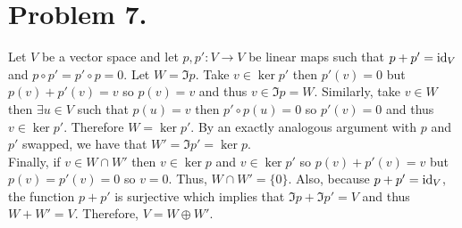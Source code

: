 \documentclass[12pt]{extarticle}
\begin{document}
\section*{Problem 7.}

Let $V$ be a vector space and let $p, p' : V \to V$ be linear maps such that $p + p' = \mathrm{id}_V$ and $p \circ p' = p' \circ p = 0$. Let $W = \Im{p}$. Take $v \in \ker{p'}$ then $p'(v) = 0$ but $p(v) + p'(v) = v$ so $p(v) = v$ and thus $v \in \Im{p} = W$. Similarly, take $v \in W$ then $\exists u \in V$ such that $p(u) = v$ then $p' \circ p(u) = 0$ so $p'(v) = 0$ and thus $v \in \ker{p'}$. Therefore $W = \ker{p'}$. By an exactly analogous argument with $p$ and $p'$ swapped, we have that $W' = \Im{p'} =\ker{p}$. \bigskip \\
Finally, if $v \in W \cap W'$ then $v \in \ker{p}$ and $v \in \ker{p'}$ so $p(v) + p'(v) = v$ but $p(v) = p'(v) = 0$ so $v = 0$. Thus, $W \cap W' = \{0\}$. Also, because $p + p' = \mathrm{id}_V$, the function $p + p'$ is surjective which implies that $\Im{p} + \Im{p'} = V$ and thus $W + W' = V$. Therefore, $V = W \oplus W'$.   
\end{document}
